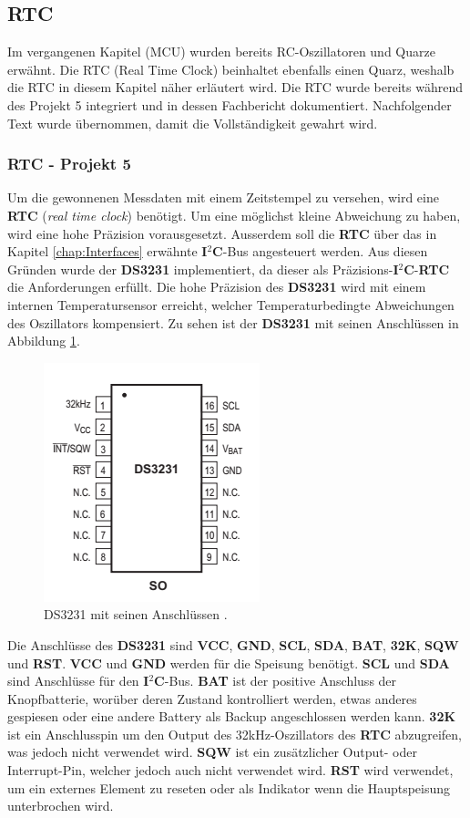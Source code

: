 \subsection{RTC}
\label{subsec:RTC}
Im vergangenen Kapitel (MCU) wurden bereits RC-Oszillatoren und Quarze erwähnt. Die RTC (Real Time Clock) beinhaltet ebenfalls einen Quarz, weshalb die RTC in diesem Kapitel näher erläutert wird.
Die RTC wurde bereits während des Projekt 5 integriert und in dessen Fachbericht dokumentiert. Nachfolgender Text wurde übernommen, damit die Vollständigkeit gewahrt wird.

\subsubsection{RTC - Projekt 5}
Um die gewonnenen Messdaten mit einem Zeitstempel zu versehen, wird eine \textbf{RTC} (\textit{real time clock}) benötigt. Um eine möglichst kleine Abweichung zu haben, wird eine hohe Präzision vorausgesetzt. Ausserdem soll die \textbf{RTC} über das in Kapitel \ref{chap:Interfaces} erwähnte \textbf{I$^2$C}-Bus angesteuert werden. Aus diesen Gründen wurde der \textbf{DS3231} implementiert, da dieser als Präzisions-\textbf{I$^2$C}-\textbf{RTC} die Anforderungen erfüllt. Die hohe Präzision des \textbf{DS3231} wird mit einem internen Temperatursensor erreicht, welcher Temperaturbedingte Abweichungen des Oszillators kompensiert. Zu sehen ist der \textbf{DS3231} mit seinen Anschlüssen in Abbildung \ref{fig:DS3231}.

\begin{figure}[h]
\centering
\includegraphics[width=0.4\linewidth]{graphics/DS3231.png}
\caption{DS3231 mit seinen Anschlüssen \cite{DS3231DS}.}
\label{fig:DS3231}
\end{figure}

Die Anschlüsse des \textbf{DS3231} sind \textbf{VCC}, \textbf{GND}, \textbf{SCL}, \textbf{SDA}, \textbf{BAT}, \textbf{32K}, \textbf{SQW} und \textbf{RST}. \textbf{VCC} und \textbf{GND} werden für die Speisung benötigt. \textbf{SCL} und \textbf{SDA} sind Anschlüsse für den \textbf{I$^2$C}-Bus. \textbf{BAT} ist der positive Anschluss der Knopfbatterie, worüber deren Zustand kontrolliert werden, etwas anderes gespiesen oder eine andere Battery als Backup angeschlossen werden kann. \textbf{32K} ist ein Anschlusspin um den Output des 32kHz-Oszillators des \textbf{RTC} abzugreifen, was jedoch nicht verwendet wird. \textbf{SQW} ist ein zusätzlicher Output- oder Interrupt-Pin, welcher jedoch auch nicht verwendet wird. \textbf{RST} wird verwendet, um ein externes Element zu reseten oder als Indikator wenn die Hauptspeisung unterbrochen wird. \cite{DS3231DS}\\

